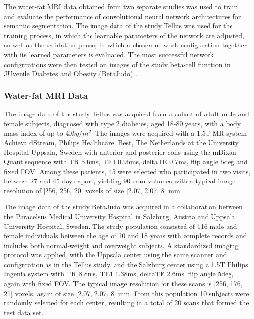 \documentclass[10pt,letterpaper]{article}
\begin{document}
	The water-fat MRI data obtained from two separate studies was used to train and evaluate the performance of convolutional neural network architectures for semantic segmentation. The image data of the study Tellus was used for the training process, in which the learnable parameters of the network are adjusted, as well as the validation phase, in which a chosen network configuration together with its learned parameters is evaluated. The most successful network configurations were then tested on images of the study beta-cell function in JUvenile Diabetes and Obesity (BetaJudo) \cite{staaf2017pancreatic}. \\
	
	\subsubsection*{Water-fat MRI Data}
	
	The image data of the study Tellus was acquired from a cohort of adult male and female subjects, diagnosed with type 2 diabetes, aged 18-80 years, with a body mass index of up to $40kg/m^2$. The images were acquired with a 1.5T MR system Achieva dStream, Philips Healthcare, Best, The Netherlands at the University Hospital Uppsala, Sweden with anterior and posterior coils using the mDixon Quant sequence with TR 5.6ms, TE1 0.95ms, deltaTE 0.7ms, flip angle 5deg and fixed FOV. Among these patients, 45 were selected who participated in two visits, between 27 and 45 days apart, yielding 90 scan volumes with a typical image resolution of [256, 256, 20] voxels of size [2.07, 2.07, 8] mm. 
	
	The image data of the study BetaJudo \cite{staaf2017pancreatic} was acquired in a collaboration between the Paracelsus Medical University Hospital in Salzburg, Austria and Uppsala University Hospital, Sweden. The study population consisted of 116 male and female individuals between the age of 10 and 18 years with complete records and includes both normal-weight and overweight subjects. A standardized imaging protocol was applied, with the Uppsala center using the same scanner and configuration as in the Tellus study, and the Salzburg center using a 1.5T Philips Ingenia system with TR 8.8ms, TE1 1.38ms, deltaTE 2.6ms, flip angle 5deg, again with fixed FOV. The typical image resolution for these scans is [256, 176, 21] voxels, again of size [2.07, 2.07, 8] mm. From this population 10 subjects were randomly selected for each center, resulting in a total of 20 scans that formed the test data set. \\
	
\end{document}
